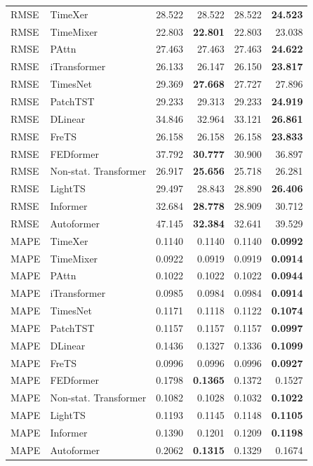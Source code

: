 \begin{longtable}{llrrrr}
\midrule
RMSE & TimeXer & 28.522 & 28.522 & 28.522 & \textbf{24.523} \\
RMSE & TimeMixer & 22.803 & \textbf{22.801} & 22.803 & 23.038 \\
RMSE & PAttn & 27.463 & 27.463 & 27.463 & \textbf{24.622} \\
RMSE & iTransformer & 26.133 & 26.147 & 26.150 & \textbf{23.817} \\
RMSE & TimesNet & 29.369 & \textbf{27.668} & 27.727 & 27.896 \\
RMSE & PatchTST & 29.233 & 29.313 & 29.233 & \textbf{24.919} \\
RMSE & DLinear & 34.846 & 32.964 & 33.121 & \textbf{26.861} \\
RMSE & FreTS & 26.158 & 26.158 & 26.158 & \textbf{23.833} \\
RMSE & FEDformer & 37.792 & \textbf{30.777} & 30.900 & 36.897 \\
RMSE & Non-stat. Transformer & 26.917 & \textbf{25.656} & 25.718 & 26.281 \\
RMSE & LightTS & 29.497 & 28.843 & 28.890 & \textbf{26.406} \\
RMSE & Informer & 32.684 & \textbf{28.778} & 28.909 & 30.712 \\
RMSE & Autoformer & 47.145 & \textbf{32.384} & 32.641 & 39.529 \\
\midrule
MAPE & TimeXer & 0.1140 & 0.1140 & 0.1140 & \textbf{0.0992} \\
MAPE & TimeMixer & 0.0922 & 0.0919 & 0.0919 & \textbf{0.0914} \\
MAPE & PAttn & 0.1022 & 0.1022 & 0.1022 & \textbf{0.0944} \\
MAPE & iTransformer & 0.0985 & 0.0984 & 0.0984 & \textbf{0.0914} \\
MAPE & TimesNet & 0.1171 & 0.1118 & 0.1122 & \textbf{0.1074} \\
MAPE & PatchTST & 0.1157 & 0.1157 & 0.1157 & \textbf{0.0997} \\
MAPE & DLinear & 0.1436 & 0.1327 & 0.1336 & \textbf{0.1099} \\
MAPE & FreTS & 0.0996 & 0.0996 & 0.0996 & \textbf{0.0927} \\
MAPE & FEDformer & 0.1798 & \textbf{0.1365} & 0.1372 & 0.1527 \\
MAPE & Non-stat. Transformer & 0.1082 & 0.1028 & 0.1032 & \textbf{0.1022} \\
MAPE & LightTS & 0.1193 & 0.1145 & 0.1148 & \textbf{0.1105} \\
MAPE & Informer & 0.1390 & 0.1201 & 0.1209 & \textbf{0.1198} \\
MAPE & Autoformer & 0.2062 & \textbf{0.1315} & 0.1329 & 0.1674 \\
\end{longtable}
\endgroup

